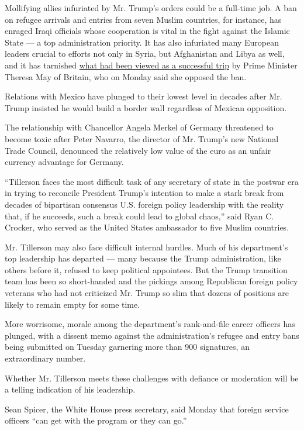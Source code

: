 Mollifying allies infuriated by Mr. Trump's orders could be a full-time
job. A ban on refugee arrivals and entries from seven Muslim countries,
for instance, has enraged Iraqi officials whose cooperation is vital in
the fight against the Islamic State --- a top administration priority.
It has also infuriated many European leaders crucial to efforts not only
in Syria, but Afghanistan and Libya as well, and it has tarnished
\href{https://www.nytimes.com/2017/01/30/world/europe/donald-trump-us-alllies.html}{what
had been viewed as a successful trip} by Prime Minister Theresa May of
Britain, who on Monday said she opposed the ban.

Relations with Mexico have plunged to their lowest level in decades
after Mr. Trump insisted he would build a border wall regardless of
Mexican opposition.

The relationship with Chancellor Angela Merkel of Germany threatened to
become toxic after Peter Navarro, the director of Mr. Trump's new
National Trade Council, denounced the relatively low value of the euro
as an unfair currency advantage for Germany.

``Tillerson faces the most difficult task of any secretary of state in
the postwar era in trying to reconcile President Trump's intention to
make a stark break from decades of bipartisan consensus U.S. foreign
policy leadership with the reality that, if he succeeds, such a break
could lead to global chaos,'' said Ryan C. Crocker, who served as the
United States ambassador to five Muslim countries.

Mr. Tillerson may also face difficult internal hurdles. Much of his
department's top leadership has departed --- many because the Trump
administration, like others before it, refused to keep political
appointees. But the Trump transition team has been so short-handed and
the pickings among Republican foreign policy veterans who had not
criticized Mr. Trump so slim that dozens of positions are likely to
remain empty for some time.

More worrisome, morale among the department's rank-and-file career
officers has plunged, with a dissent memo against the administration's
refugee and entry bans being submitted on Tuesday garnering more than
900 signatures, an extraordinary number.

Whether Mr. Tillerson meets these challenges with defiance or moderation
will be a telling indication of his leadership.

Sean Spicer, the White House press secretary, said Monday that foreign
service officers ``can get with the program or they can go.''

